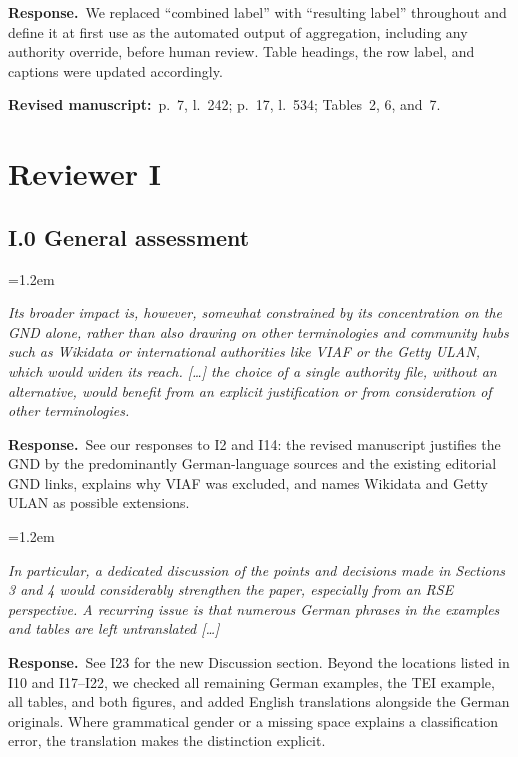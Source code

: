 \documentclass[11pt,a4paper]{article}
\newenvironment{reviewercomment}
  {\par\smallskip\begin{list}{}{\leftmargin=1.2em\rightmargin=0pt}\item[]\color{black!75}\itshape}
  {\end{list}\smallskip}
\newcommand{\response}{\par\noindent\textbf{Response.}~}
\newcommand{\where}[1]{\par\noindent\textbf{Revised manuscript:}~#1\par\medskip}
\begin{document}
\response We replaced ``combined label'' with ``resulting label'' throughout and define it at first use
as the automated
output of aggregation, including any authority override, before human review. Table headings, the
row label, and captions were updated accordingly.

\where{p.~7, l.~242; p.~17, l.~534; Tables~2, 6, and~7.}

\section*{Reviewer I}

\subsection*{I.0 General assessment}

\begin{reviewercomment}
Its broader impact is, however, somewhat constrained by its concentration on the GND alone, rather
than also drawing on other terminologies and community hubs such as Wikidata or international
authorities like VIAF or the Getty ULAN, which would widen its reach. [\dots] the choice of a single
authority file, without an alternative, would benefit from an explicit justification or from
consideration of other terminologies.
\end{reviewercomment}

\response See our responses to I2 and I14: the revised manuscript justifies the GND by the
predominantly German-language sources and the existing editorial GND links, explains why VIAF was
excluded, and names Wikidata and Getty ULAN as possible extensions.

\begin{reviewercomment}
In particular, a dedicated discussion of the points and decisions made in Sections 3 and 4 would
considerably strengthen the paper, especially from an RSE perspective. A recurring issue is that
numerous German phrases in the examples and tables are left untranslated [\dots]
\end{reviewercomment}

\response See I23 for the new Discussion section. Beyond the locations listed in I10 and I17--I22,
we checked all remaining German examples, the TEI example, all tables, and both figures, and added
English translations alongside the German originals. Where grammatical gender or a missing space
explains a classification error, the translation makes the distinction explicit.
\end{document}

